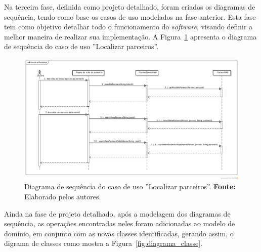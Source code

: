 \par Na terceira fase, definida como projeto detalhado, foram criados os diagramas de sequência, tendo como base os casos de uso modelados na fase anterior. Esta fase tem como objetivo detalhar todo o funcionamento do \textit{software}, visando definir a melhor maneira de realizar sua implementação. A Figura~\ref{fig:diagrama_sequencia_localizar_parceiros} apresenta o diagrama de sequência do caso de uso ''Localizar parceiros''.

\newpage
\begin{figure}[h!]
	\centerline{\includegraphics[angle=90,scale=0.4]{./imagens/apendices/diagrama-sequencia-localizar-parceiros.png}}
	\caption[Diagrama de sequência do caso de uso ''Localizar parceiros'']
	{Diagrama de sequência do caso de uso ''Localizar parceiros''. \textbf{Fonte:} Elaborado pelos autores.}
	\label{fig:diagrama_sequencia_localizar_parceiros}
\end{figure}

\par Ainda na fase de projeto detalhado, após a modelagem dos diagramas de sequência, as operações encontradas neles foram adicionadas ao modelo de domínio, em conjunto com as novas classes identificadas, gerando assim, o digrama de classes como mostra a Figura~\ref{fig:diagrama_classe}.

